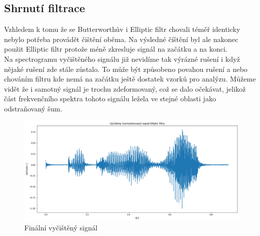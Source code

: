 \documentclass{article}
\begin{document}
\subsection{Shrnutí filtrace}
Vzhledem k tomu že se Butterworthův i Elliptic filtr chovali téměř identicky nebylo potřeba provádět čištění oběma.
Na výsledné číštění byl ale nakonec použit Elliptic filtr protože méně zkresluje signál na začátku a na konci.\\
Na spectrogramu vyčištěného signálu již nevidíme tak výrázné rušení i když nějaké rušení zde stále zůstalo. To může být způsobeno povahou rušení a nebo chováním filtru kde nemá na začátku ještě dostatek vzorků pro analýzu.
Můžeme vidět že i samotný signál je trochu zdeformovaný, což se dalo očekávat, jelikož část frekvenčního spektra tohoto signálu ležela ve stejné oblasti jako odstraňovaný šum.

\begin{landscape}
	\begin{figure}[H] 
		\centering
		\includegraphics[scale=0.55,keepaspectratio]{Figure_30}
		\caption{Finální vyčištěný signál}
	\end{figure}
\end{landscape}
\end{document}
